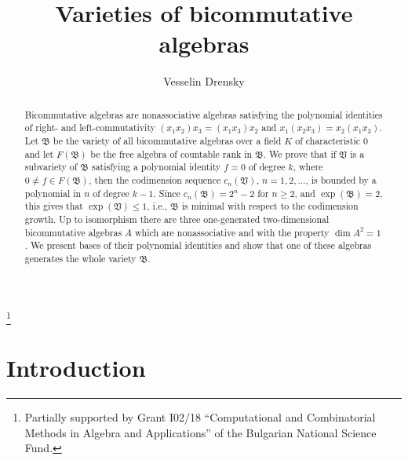\documentclass{amsart}[12pt]
\theoremstyle{definition}
\begin{document}
\title[Varieties of bicommutative algebras]
{Varieties of bicommutative algebras}
\author{Vesselin Drensky}
\date{}
\address{Institute of Mathematics and Informatics,
Bulgarian Academy of Sciences,
Acad. G. Bonchev Str., Block 8,
1113 Sofia, Bulgaria}
\thanks
{Partially supported by Grant I02/18
``Computational and Combinatorial Methods
in Algebra and Applications''
of the Bulgarian National Science Fund.}
\maketitle

\begin{abstract}
Bicommutative algebras are nonassociative algebras satisfying the polynomial identities
of right- and left-commutativity $(x_1x_2)x_3=(x_1x_3)x_2$ and $x_1(x_2x_3)=x_2(x_1x_3)$.
Let $\mathfrak B$ be the variety of all bicommutative algebras over a field $K$ of characteristic 0 and let $F({\mathfrak B})$ be the free
algebra of countable rank in $\mathfrak B$. We prove that if $\mathfrak V$ is a subvariety of $\mathfrak B$
satisfying a polynomial identity $f=0$ of degree $k$, where $0\not=f\in F({\mathfrak B})$, then the codimension sequence
$c_n({\mathfrak V})$, $n=1,2,\ldots$,
is bounded by a polynomial in $n$ of degree $k-1$. Since $c_n({\mathfrak B})=2^n-2$ for $n\geq 2$, and $\exp({\mathfrak B})=2$,
this gives that $\exp({\mathfrak V})\leq 1$, i.e., $\mathfrak B$ is minimal with respect to the codimension growth.
Up to isomorphism there are three one-generated two-dimensional bicommutative algebras $A$ which are nonassociative
and with the property $\dim A^2=1$. We present bases of their polynomial identities and show that one of these algebras
generates the whole variety $\mathfrak B$.
\end{abstract}

\section{Introduction}
\end{document}

